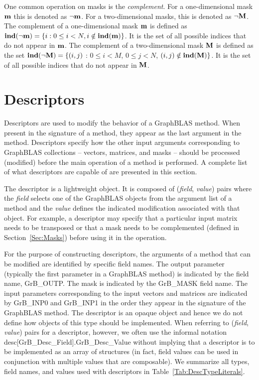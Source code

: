 One common operation on masks is the \emph{complement}.
For a one-dimensional mask ${\bf m}$ this is denoted as
$\neg{\bf m}$. For a two-dimensional masks, this is denoted as
$\neg{\bf M}$.  The complement of a one-dimensional
mask ${\bf m}$ is defined as $\mathbf{ind}(\neg{\bf m}) = \{i : 0
\leq i < N, i \notin \mathbf{ind}({\bf m}) \}$.  It is the set of all
possible indices that do not appear in ${\bf m}$.  The 
complement of a two-dimensional mask ${\bf M}$ is defined as the set
$\mathbf{ind}(\neg{\bf M}) = \{(i,j)$ : $0 \leq i < M$, $0 \leq j < N$,
$(i,j) \notin \mathbf{ind}({\bf M}) \}$.  It is the set of all possible
indices that do not appear in ${\bf M}$.

\section{Descriptors}
\label{Sec:Descriptors}

Descriptors are used to modify the behavior of a GraphBLAS method.
When present in the signature of a method, they appear as the last
argument in the method.  Descriptors specify how the other input arguments
corresponding to GraphBLAS collections -- vectors, matrices, and masks
-- should be processed (modified) before the main operation of a method
is performed.  A complete list of
what descriptors are capable of are presented in this section.

The descriptor is a lightweight object.  It is composed of (\emph{field},
\emph{value}) pairs where the \emph{field} selects one of the GraphBLAS objects
from the argument list of a method and the \emph{value} defines the
indicated modification associated with that object.  For example,
a descriptor may specify that a particular input matrix needs to be
transposed or that a mask needs to be complemented (defined
in Section~\ref{Sec:Masks}) before using it in the operation.

For the purpose of constructing descriptors, the arguments of a method
that can be modified are identified by specific field names. The output
parameter (typically the first parameter in a GraphBLAS method) is
indicated by the field name, {\sf GrB\_OUTP}.  The mask is indicated
by the {\sf GrB\_MASK} field name. The input parameters corresponding
to the input vectors and matrices are indicated by {\sf GrB\_INP0}
and {\sf GrB\_INP1} in the order they appear in the signature of the
GraphBLAS method.  The descriptor is an opaque object and hence we do not
define how objects of this type should be implemented.   When referring to
(\emph{field}, \emph{value}) pairs for a descriptor, however, we often use the informal
notation {\sf desc[GrB\_Desc\_Field].GrB\_Desc\_Value} without implying
that a descriptor is to be implemented as an array of structures (in fact,
field values can be used in conjunction with multiple values that are composable).
We summarize all types, field names, and values used with descriptors
in Table~\ref{Tab:DescTypeLiterals}.


